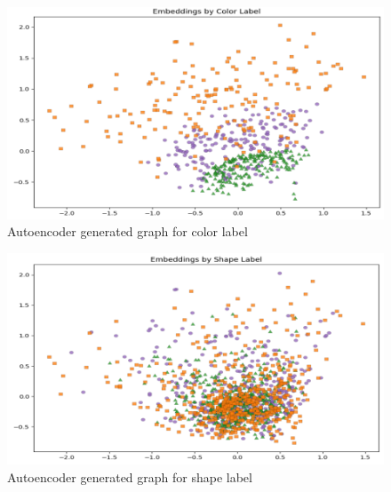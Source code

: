 \documentclass{article}
\begin{document}
\begin{figure}[h]
    \centering
    \includegraphics[scale=0.25]{autoencoder_color_label}
    \caption{Autoencoder generated graph for color label}
    \label{fig:autoencoder_color_label1}
\end{figure}
\begin{figure}[h]
    \centering
    \includegraphics[scale=0.25]{autoencoder_shape_label}
    \caption{Autoencoder generated graph for shape label}
    \label{fig:autoencoder_color_label1}
\end{figure}
\end{document}
